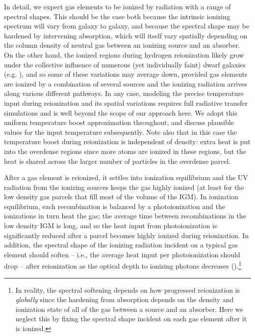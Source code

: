 In detail, we expect gas elements to be ionized by radiation with a range of spectral shapes. This should be the case both
because the intrinsic ionizing spectrum will vary from galaxy to galaxy, and because
the spectral shape may be hardened by intervening absorption, which will itself vary spatially depending on the column density
of neutral gas between an ionizing source and an absorber. On the other hand, the ionized regions during hydrogen reionization
likely grow under the collective influence of numerous (yet individually faint) dwarf galaxies (e.g. \citealt{Robertson:2013bq}), and so
some of these variations may average down, provided gas elements are ionized by a combination of several sources and
the ionizing radiation arrives along various different pathways.
In any case, modeling the precise temperature input during reionization and its spatial variations requires full radiative
transfer simulations and is well beyond the scope of our approach here.
We adopt this uniform temperature boost approximation throughout, and discuss plausible values for the input temperature subsequently. Note also that in this case
the temperature boost during reionization is 
independent of density: extra heat is put into the overdense regions since more
atoms are ionized in these regions, but the heat is shared across the larger number of particles in the overdense parcel.

After a gas element is reionized, it settles into ionization equilibrium and the
UV radiation from the ionizing sources keeps the gas highly ionized (at least for the low density gas parcels that fill most
of the volume of the IGM). 
In ionization equilibrium, each recombination is balanced by a photoionization and the ionizations in turn heat
the gas; the average time between recombinations in the low density IGM is long, and so the heat input from photoionization
is significantly reduced after a parcel becomes highly ionized during reionization. In 
addition, the spectral shape of the ionizing radiation incident on
a typical gas element should soften -- i.e., the average heat input per photoionization should drop -- after reionization as the optical depth to ionizing photons decreases (\citealt{Abel:1999vj}).\footnote{In reality, the spectral
softening depends on how progressed reionization is {\em globally} since the hardening from absorption depends on the 
density and ionization
state of all of the gas between a source and an absorber. Here we neglect this by fixing the spectral shape incident on each
gas element after it is ionized.}

